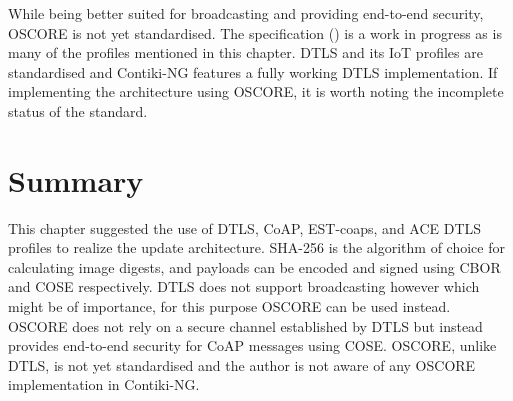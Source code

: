 \documentclass[0-thesis.tex]{subfiles}
\begin{document}
While being better suited for broadcasting and providing end-to-end security, OSCORE is
not yet standardised. The specification (\parencite{oscore}) is a work in progress as is
many of the profiles mentioned in this chapter. DTLS and its IoT profiles are standardised
and Contiki-NG features a fully working DTLS implementation. If implementing the
architecture using OSCORE, it is worth noting the incomplete status of the standard.

\section{Summary}
\label{sec:profile-summary}
This chapter suggested the use of DTLS, CoAP, EST-coaps, and ACE DTLS profiles to realize
the update architecture. SHA-256 is the algorithm of choice for calculating image digests,
and payloads can be encoded and signed using CBOR and COSE respectively. DTLS does not
support broadcasting however which might be of importance, for this purpose OSCORE can be
used instead. OSCORE does not rely on a secure channel established by DTLS but instead
provides end-to-end security for CoAP messages using COSE. OSCORE, unlike DTLS, is not yet
standardised and the author is not aware of any OSCORE implementation in Contiki-NG. 
\end{document}
